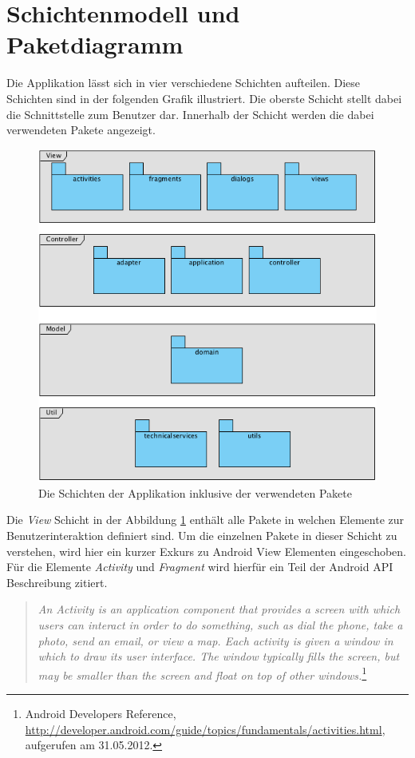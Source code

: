 \section{Schichtenmodell und Paketdiagramm}
Die Applikation lässt sich in vier verschiedene Schichten aufteilen. Diese Schichten sind in der folgenden Grafik illustriert. Die oberste Schicht stellt dabei die Schnittstelle zum Benutzer dar. Innerhalb der Schicht werden die dabei verwendeten Pakete angezeigt.  
\begin{figure}[h!]
\caption{Die Schichten der Applikation inklusive der verwendeten Pakete}
\label{fig:layer}
\centering
\includegraphics[scale=0.9]{05bericht/images/packagediagram.png}
\end{figure} 

Die \textit{View} Schicht in der Abbildung \ref{fig:layer} enthält alle Pakete in welchen Elemente zur Benutzerinteraktion definiert sind. Um die einzelnen Pakete in dieser Schicht zu verstehen, wird hier ein kurzer Exkurs zu Android View Elementen eingeschoben. Für die Elemente \textit{Activity} und \textit{Fragment} wird hierfür ein Teil der Android API Beschreibung zitiert.

\begin{quote}
\textit{An Activity is an application component that provides a screen with which users can interact in order to do something, such as dial the phone, take a photo, send an email, or view a map. Each activity is given a window in which to draw its user interface. The window typically fills the screen, but may be smaller than the screen and float on top of other windows.}\footnote{Android Developers Reference, \url{http://developer.android.com/guide/topics/fundamentals/activities.html}, aufgerufen am 31.05.2012.}
\end{quote}

